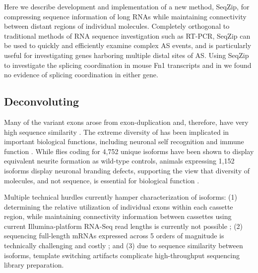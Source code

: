 {	Here we describe development and implementation of a new method, SeqZip, for compressing sequence information of long RNAs while maintaining connectivity between distant regions of individual molecules. Completely orthogonal to traditional methods of RNA sequence investigation such as RT-PCR, SeqZip can be used to quickly and efficiently examine complex AS events, and is particularly useful for investigating genes harboring multiple distal sites of AS. Using SeqZip to investigate the splicing coordination in mouse Fn1 transcripts and in \flies{} \dscam{} we found no evidence of splicing coordination in either gene. 

	\subsection{Deconvoluting \dscam{}}

		Many of the \dscam{} variant exons arose from exon-duplication and, therefore, have very high sequence similarity \citep{Lee2010b}. The extreme diversity of \dscam{} has been implicated in important biological functions, including neuronal self recognition and immune function \citep{Wojtowicz2004,LawrenceZipursky2013,Watson2005}. While flies coding for 4,752 unique isoforms have been shown to display equivalent neurite formation as wild-type controls, animals expressing 1,152 isoforms display neuronal branding defects, supporting the view that diversity of molecules, and not sequence, is essential for biological function \citep{Hattori2009}.

		Multiple technical hurdles currently hamper characterization of \dscam{} isoforms: (1) determining the relative utilization of individual exons within each cassette region, while maintaining connectivity information between cassettes using current Illumina-platform RNA-Seq read lengths is currently not possible \citep{Neves2004,LawrenceZipursky2013,LeGault2013}; (2) sequencing full-length mRNAs expressed across 5 orders of magnitude is technically challenging and costly \citep{Hattori2008,Sharon2013}; and (3) due to sequence similarity between \dscam{} isoforms, template switching artifacts complicate high-throughput sequencing library preparation.

}
